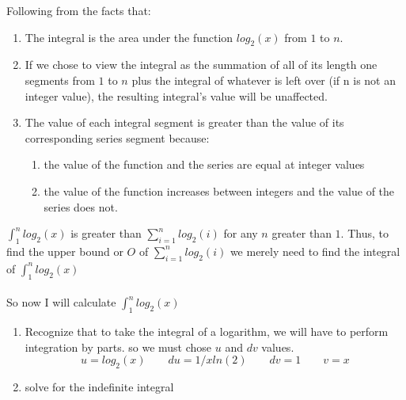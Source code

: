 \documentclass[10pt,a4paper]{article}
\begin{document}
Following from the facts that:
\begin{enumerate}
\item The integral is the area under the function $log_2(x)$ from $1$ to $n$.
\item If we chose to view the integral as the summation of all of its length one segments from $1$ to $n$ plus the integral of whatever is left over (if n is not an integer value), the resulting integral's value will be unaffected.
\item The value of each integral segment is greater than the value of its corresponding series segment because:
\begin{enumerate}
  \item the value of the function and the series are equal at integer values
  \item the value of the function increases between integers and the value of the series does not.
\end{enumerate}
\end{enumerate}
$\int_1^n log_2(x)$ is greater than $\sum_{i = 1}^n log_2(i)$ for any $n$ greater than $1$. Thus, to find the upper bound or $O$ of $\sum_{i = 1}^n log_2(i)$ we merely need to find the integral of $\int_1^n log_2(x)$\\\\
So now I will calculate $\int_1^n log_2(x)$
\begin{enumerate}
  \item Recognize that to take the integral of a logarithm, we will have to perform integration by parts. so we must chose $u$ and $dv$ values.
  \begin{equation}
    u = log_2(x)\qquad du = 1/xln(2) \qquad dv = 1 \qquad v = x
  \end{equation}
  \item solve for the indefinite integral
\end{enumerate}
\end{document}
